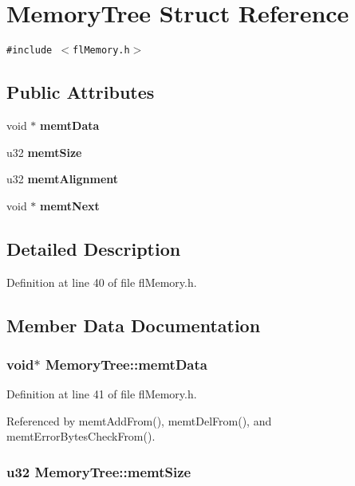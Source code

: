 \section{Memory\-Tree Struct Reference}
\label{structMemoryTree}
{\tt \#include $<$fl\-Memory.h$>$}

\subsection*{Public Attributes}
\begin{CompactItemize}
\item 
void $\ast$ {\bf memt\-Data}
\item 
u32 {\bf memt\-Size}
\item 
u32 {\bf memt\-Alignment}
\item 
void $\ast$ {\bf memt\-Next}
\end{CompactItemize}


\subsection{Detailed Description}




Definition at line 40 of file fl\-Memory.h.

\subsection{Member Data Documentation}
\subsubsection{\setlength{\rightskip}{0pt plus 5cm}void$\ast$ {\bf Memory\-Tree::memt\-Data}}\label{structMemoryTree_9775b2e155f9598f802be0e4541a0a47}




Definition at line 41 of file fl\-Memory.h.

Referenced by memt\-Add\-From(), memt\-Del\-From(), and memt\-Error\-Bytes\-Check\-From().
\subsubsection{\setlength{\rightskip}{0pt plus 5cm}u32 {\bf Memory\-Tree::memt\-Size}}\label{structMemoryTree_bab863ed02c9c8810a9102053f546e8f}




